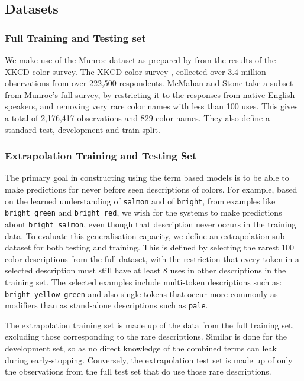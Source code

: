 \documentclass[11pt,a4paper]{article}
\newcommand{\parencite}{\citep}
\newcommand{\textcite}{\citet}
\begin{document}
\subsection{Datasets}

\subsubsection{Full Training and Testing set}
We make use of the  Munroe dataset as prepared by \textcite{mcmahan2015bayesian} from the results of the XKCD color survey.
The XKCD color survey \parencite{Munroe2010XKCDdataset}, collected over 3.4 million observations from over 222,500 respondents.
McMahan and Stone take a subset from Munroe's full survey, by restricting it to the responses from native English speakers, 
and removing very rare color names with less than 100 uses.
This gives a total of 2,176,417 observations and 829 color names. 
They also define a standard test, development and train split.


\subsubsection{Extrapolation Training and Testing Set} \label{sec:extrapodata}
The primary goal in constructing using the term based models is to be able to make predictions for never before seen descriptions of colors.
For example, based on the learned understanding of \texttt{salmon} and of \texttt{bright}, from examples like \texttt{bright green} and \texttt{bright red}, we wish for the systems to make predictions about \texttt{bright salmon}, even though that description never occurs in the training data.
%
To evaluate this generalisation capacity, we define an extrapolation sub-dataset for both testing and training.
This is defined by selecting the rarest 100 color descriptions from the full dataset,
with the restriction that every token in a selected description must still have at least 8 uses in other descriptions in the training set.
The selected examples include multi-token descriptions such as: \texttt{bright yellow green} and also single tokens that occur more commonly as modifiers than as stand-alone descriptions such as \texttt{pale}.

The extrapolation training set is made up of the data from the full training set, excluding those  corresponding to the rare descriptions.
Similar is done for the development set, so as no direct knowledge of the combined terms can leak during early-stopping.
Conversely, the extrapolation test set is made up of only the observations from the full test set that do use those rare descriptions.
\end{document}
